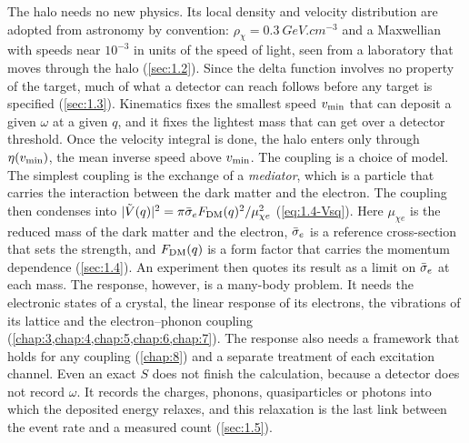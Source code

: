 The halo needs no new physics. Its local density and velocity distribution are adopted from astronomy by convention: $\rho_\chi = \SI{0.3}{GeV.cm^{-3}}$ and a Maxwellian with speeds near $10^{-3}$ in units of the speed of light, seen from a laboratory that moves through the halo (\cref{sec:1.2}). Since the delta function involves no property of the target, much of what a detector can reach follows before any target is specified (\cref{sec:1.3}). Kinematics fixes the smallest speed $v_{\mathrm{min}}$ that can deposit a given $\omega$ at a given $q$, and it fixes the lightest mass that can get over a detector threshold. Once the velocity integral is done, the halo enters only through $\eta(v_{\mathrm{min}})$, the mean inverse speed above $v_{\mathrm{min}}$. The coupling is a choice of model. The simplest coupling is the exchange of a \emph{mediator}, which is a particle that carries the interaction between the dark matter and the electron. The coupling then condenses into $|\tilde V(q)|^2 = \pi\bar{\sigma}_{e}F_{\mathrm{DM}}(q)^2/\mu_{\chi e}^2$ (\cref{eq:1.4-Vsq}). Here $\mu_{\chi e}$ is the reduced mass of the dark matter and the electron, $\bar{\sigma}_{e}$ is a reference cross-section that sets the strength, and $F_{\mathrm{DM}}(q)$ is a form factor that carries the momentum dependence (\cref{sec:1.4}). An experiment then quotes its result as a limit on $\bar{\sigma}_{e}$ at each mass. The response, however, is a many-body problem. It needs the electronic states of a crystal, the linear response of its electrons, the vibrations of its lattice and the electron--phonon coupling (\cref{chap:3,chap:4,chap:5,chap:6,chap:7}). The response also needs a framework that holds for any coupling (\cref{chap:8}) and a separate treatment of each excitation channel. Even an exact $S$ does not finish the calculation, because a detector does not record $\omega$. It records the charges, phonons, quasiparticles or photons into which the deposited energy relaxes, and this relaxation is the last link between the event rate and a measured count (\cref{sec:1.5}).

